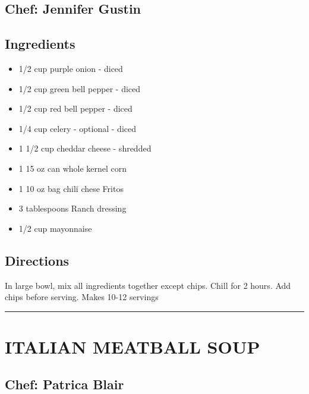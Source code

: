 \documentclass[
]{book}
\providecommand{\tightlist}{%
  \setlength{\itemsep}{0pt}\setlength{\parskip}{0pt}}
\begin{document}
\hypertarget{chef-jennifer-gustin-4}{%
\subsection*{Chef: Jennifer Gustin}\label{chef-jennifer-gustin-4}}


\hypertarget{ingredients-18}{%
\subsection*{Ingredients}\label{ingredients-18}}


\begin{itemize}
\tightlist
\item
  1/2 cup purple onion - diced
\item
  1/2 cup green bell pepper - diced
\item
  1/2 cup red bell pepper - diced
\item
  1/4 cup celery - optional - diced
\item
  1 1/2 cup cheddar cheese - shredded
\item
  1 15 oz can whole kernel corn
\item
  1 10 oz bag chili chese Fritos
\item
  3 tablespoons Ranch dressing
\item
  1/2 cup mayonnaise
\end{itemize}

\hypertarget{directions-18}{%
\subsection*{Directions}\label{directions-18}}


In large bowl, mix all ingredients together except chips. Chill for 2 hours. Add chips before serving. Makes 10-12 servings

\begin{center}\rule{0.5\linewidth}{0.5pt}\end{center}

\hypertarget{italian-meatball-soup}{%
\section*{ITALIAN MEATBALL SOUP}\label{italian-meatball-soup}}


\hypertarget{chef-patrica-blair}{%
\subsection*{Chef: Patrica Blair}\label{chef-patrica-blair}}
\end{document}
